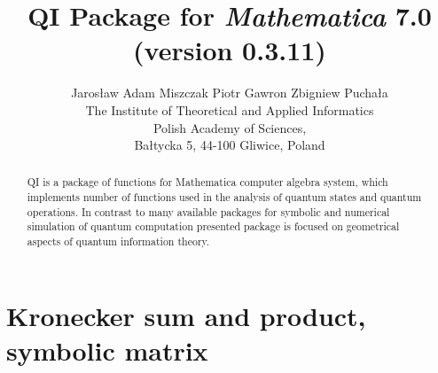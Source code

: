 \documentclass[a4paper,10pt]{scrartcl}
\begin{document}
\title{QI Package for \emph{Mathematica} 7.0 \\(version 0.3.11)}\author{Jaros{\l}aw Adam Miszczak \quad Piotr Gawron \quad Zbigniew Pucha{\l}a\\
{The Institute of Theoretical and Applied Informatics}\\
{Polish Academy of Sciences},\\
{Ba{\l}tycka 5, 44-100 Gliwice, Poland}}
\maketitle
\begin{abstract}QI is a package of functions for Mathematica computer algebra system, which implements 
number of functions used in the analysis of quantum states and quantum operations. In contrast to 
many available packages for symbolic and numerical simulation of quantum computation presented 
package is focused on geometrical aspects of quantum information theory.\end{abstract}
\section{Kronecker sum and product, symbolic matrix}
\end{document}
